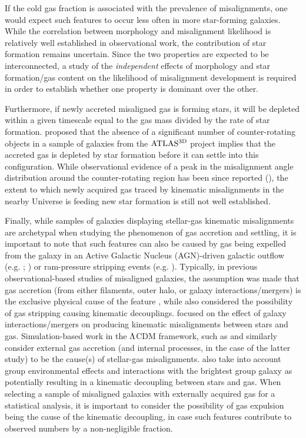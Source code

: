 \documentclass[fleqn,usenatbib]{mnras}
\begin{document}
If the cold gas fraction is associated with the prevalence of misalignments, one would expect such features to occur less often in more star-forming galaxies. While the correlation between morphology and misalignment likelihood is relatively well established in observational work, the contribution of star formation remains uncertain. Since the two properties are expected to be interconnected, a study of the \textit{independent} effects of morphology and star formation/gas content on the likelihood of misalignment development is required in order to establish whether one property is dominant over the other. 

Furthermore, if newly accreted misaligned gas is forming stars, it will be depleted within a given timescale equal to the gas mass divided by the rate of star formation. \cite{Davis2015} proposed that the absence of a significant number of counter-rotating objects in a sample of galaxies from the $\rm{ATLAS^{3D}}$ project \citep{Capellari2011} implies that the accreted gas is depleted by star formation before it can settle into this configuration. While observational evidence of a peak in the misalignment angle distribution around the counter-rotating region has been since reported (\citealt{Bryant2019}), the extent to which newly acquired gas traced
by kinematic misalignments in the  nearby Universe is feeding new star formation is still not well established.

Finally, while samples of galaxies displaying stellar-gas kinematic misalignments are archetypal when studying the phenomenon of gas accretion and settling, it is important to note that such features can also be caused by gas being expelled from the galaxy in an Active Galactic Nucleus (AGN)-driven galactic outflow (e.g. \citealt{Dumas2007}; \citealt{RongxinLuo2019L}) or ram-pressure stripping events (e.g. \citealt{Bryant2019}). Typically, in previous observational-based studies of misaligned galaxies, the assumption was made that gas accretion (from either filaments, outer halo, or galaxy interactions/mergers) is the exclusive physical cause of the feature \citep{Davis2011,Davis2015,Jin2016,Duckworth}, while \cite{Bryant2019} also considered the possibility of gas stripping causing kinematic decouplings.  \cite{BarreraBallesteros2014,Barreraballesteros2015} focused on the effect of galaxy interactions/mergers on producing kinematic misalignments between stars and gas. Simulation-based work in the $\rm{\Lambda}$CDM framework, such as \cite{CdpLagos2015} and \cite{Casanueva2022} similarly consider external gas accretion (and internal processes, in the case of the latter study) to be the cause(s) of stellar-gas misalignments. \cite{Khim2020II} also take into account group environmental effects and interactions with the brightest group galaxy as potentially resulting in a kinematic decoupling between stars and gas. 
When selecting a sample of misaligned galaxies with externally acquired gas for a statistical analysis, it is important to consider the possibility of gas expulsion being the cause of the kinematic decoupling, in case such features contribute to observed numbers by a non-negligible fraction.
\end{document}
